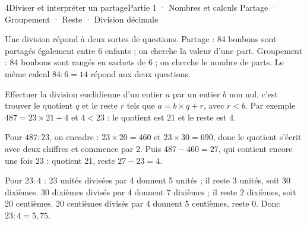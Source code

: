 \begin{ouverture}[calcul]{4}{Diviser et interpréter un partage}{Partie 1 · Nombres et calculs}
{Partage · Groupement · Reste · Division décimale}
\end{ouverture}
\pagestyle{otMain}\essentiel\fontsize{11}{15}\selectfont
{}\label{cours-4-1}
\begin{definition}Une division répond à deux sortes de questions. Partage : 84 bonbons sont partagés également entre 6 enfants ; on cherche la valeur d’une part. Groupement : 84 bonbons sont rangés en sachets de 6 ; on cherche le nombre de parts. Le même calcul $84:6=14$ répond aux deux questions.\end{definition}
\label{fig-cours-4-1-cours-partage}

\begin{definition}Effectuer la division euclidienne d’un entier $a$ par un entier $b$ non nul, c’est trouver le quotient $q$ et le reste $r$ tels que $a=b\times q+r$, avec $r<b$. Par exemple $487=23\times21+4$ et $4<23$ : le quotient est 21 et le reste est 4.\end{definition}
\begin{savoirfaire}Pour $487:23$, on encadre : $23\times20=460$ et $23\times30=690$, donc le quotient s’écrit avec deux chiffres et commence par 2. Puis $487-460=27$, qui contient encore une fois 23 : quotient 21, reste $27-23=4$.\end{savoirfaire}
\clearpage
{}\label{cours-4-2}
\begin{savoirfaire}Pour $23:4$ : 23 unités divisées par 4 donnent 5 unités ; il reste 3 unités, soit 30 dixièmes. 30 dixièmes divisés par 4 donnent 7 dixièmes ; il reste 2 dixièmes, soit 20 centièmes. 20 centièmes divisés par 4 donnent 5 centièmes, reste 0. Donc $23:4=5{,}75$.\end{savoirfaire}
\label{fig-cours-4-2-cours-potence}

